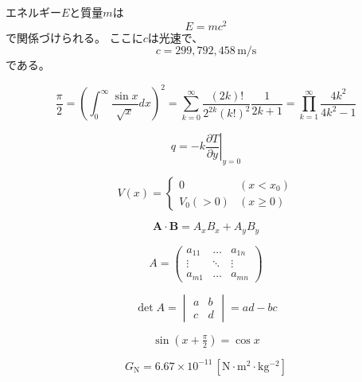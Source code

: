 \documentclass[11pt]{jsarticle}
\begin{document}
エネルギー$E$と質量$m$は
\begin{equation}
  E = mc^{2}
\end{equation}
で関係づけられる。
ここに$c$は光速で、
\begin{equation}
  c = 299{,}792{,}458 \, \mathrm{m/s}
\end{equation}
である。

\[
  \frac{\pi}{2} =
  \left( \int_{0}^{\infty} \frac{\sin x}{\sqrt{x}} dx \right)^2 =
  \sum_{k=0}^{\infty} \frac{(2k)!}{2^{2k}(k!)^2} \frac{1}{2k+1} =
  \prod_{k=1}^{\infty} \frac{4k^2}{4k^2 - 1}
\]

\begin{equation}
  q=-k\left.\frac{\partial T}{\partial y}\right|_{y=0}
\end{equation}

\begin{equation}
  V(x)=
  \begin{cases}
    0       & (x<x_0) \\
    V_0(>0) & (x\ge0)
  \end{cases}
\end{equation}

\begin{equation}
  \bm{A}\cdot\bm{B}=A_xB_x+A_yB_y
\end{equation}

\begin{equation}
  A =
  \begin{pmatrix}
    a_{11} & \ldots & a_{1n} \\
    \vdots & \ddots & \vdots \\
    a_{m1} & \ldots & a_{mn}
  \end{pmatrix}
\end{equation}

\begin{equation}
  \det A=
  \begin{vmatrix}
    a & b \\
    c & d
  \end{vmatrix}
  =ad-bc
\end{equation}

\begin{equation}
  \sin(x+\tfrac{\pi}{2})=\cos x
\end{equation}

\begin{equation}
  G_\mathrm{N}=6.67\times10^{-11}\, [\text{N$\cdot$m$^2\cdot$kg$^{-2}$}]
\end{equation}
\end{document}
